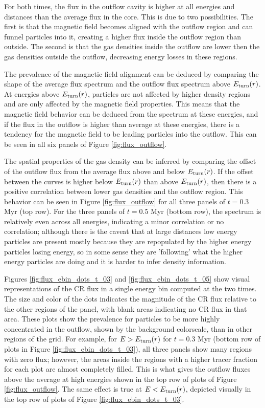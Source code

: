\documentclass[twocolumn]{aastex63}
\begin{document}
For both times, the flux in the outflow cavity is higher at all energies and distances than the average flux in the core. This is due to two possibilities. The first is that the magnetic field becomes aligned with the outflow region and can funnel particles into it, creating a higher flux inside the outflow region than outside. The second is that the gas densities inside the outflow are lower then the gas densities outside the outflow, decreasing energy losses in these regions. 

The prevalence of the magnetic field alignment can be deduced by comparing the shape of the average flux spectrum and the outflow flux spectrum above $E_{\rm turn} (r)$. At energies above $E_{\rm turn} (r)$, particles are not affected by higher density regions and are only affected by the magnetic field properties. This means that the magnetic field behavior can be deduced from the spectrum at these energies, and if the flux in the outflow is higher than average at these energies, there is a tendency for the magnetic field to be leading particles into the outflow. This can be seen in all six panels of Figure \ref{fig:flux_outflow}. 

The spatial properties of the gas density can be inferred by comparing the offset of the outflow flux from the average flux above and below $E_{\rm turn} (r)$. If the offset between the curves is higher below $E_{\rm turn} (r)$ than above $E_{\rm turn} (r)$, then there is a positive correlation between lower gas  densities and the outflow region. This behavior can be seen in Figure \ref{fig:flux_outflow} for all three panels of $t=0.3$ Myr (top row). For the three panels of $t=0.5$ Myr (bottom row), the spectrum is relatively even across all energies, indicating a minor correlation or no correlation; although there is the caveat that at large distances low energy particles are present mostly because they are repopulated by the higher energy particles losing energy, so in some sense they are 'following' what the higher energy particles are doing and it is harder to infer density information.

Figures \ref{fig:flux_ebin_dots_t_03} and \ref{fig:flux_ebin_dots_t_05} show visual representations of the CR flux in a single energy bin computed at the two times. The size and color of the dots indicates the magnitude of the CR flux relative to the other regions of the panel, with blank areas indicating no CR flux in that area. These plots show the prevalence for particles to be more highly concentrated in the outflow, shown by the background colorscale, than in other regions of the grid. For example, for $E>E_{\rm turn} (r)$ for $t=0.3$ Myr (bottom row of plots in Figure \ref{fig:flux_ebin_dots_t_03}), all three panels show many regions with zero flux; however, the areas inside the regions with a higher tracer fraction for each plot are almost completely filled. This is what gives the outflow fluxes above the average at high energies shown in the top row of plots of Figure \ref{fig:flux_outflow}. The same effect is true at $E<E_{\rm turn} (r)$, depicted visually in the top row of plots of Figure \ref{fig:flux_ebin_dots_t_03}. 
\end{document}
